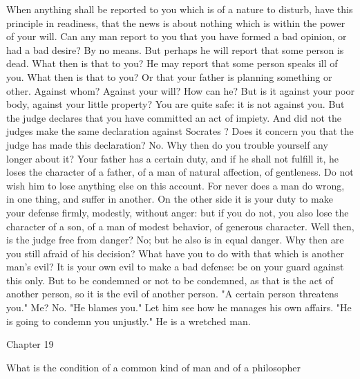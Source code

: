 \documentclass[a4paper]{article}
\begin{document}
    When anything shall be reported to you which is of a nature to disturb,
have this principle in readiness, that the news is about nothing which is
within the power of your will. Can any man report to you that you have formed a
bad opinion, or had a bad desire? By no means. But perhaps he will report that
some person is dead. What then is that to you? He may report that some person
speaks ill of you. What then is that to you? Or that your father is planning
something or other. Against whom? Against your will? How can he? But is it
against your poor body, against your little property? You are quite safe: it is
not against you. But the judge declares that you have committed an act of
impiety. And did not the judges make the same declaration against Socrates ?
Does it concern you that the judge has made this declaration? No. Why then do
you trouble yourself any longer about it? Your father has a certain duty, and
if he shall not fulfill it, he loses the character of a father, of a man of
natural affection, of gentleness. Do not wish him to lose anything else on this
account. For never does a man do wrong, in one thing, and suffer in another. On
the other side it is your duty to make your defense firmly, modestly, without
anger: but if you do not, you also lose the character of a son, of a man of
modest behavior, of generous character. Well then, is the judge free from
danger? No; but he also is in equal danger. Why then are you still afraid of
his decision? What have you to do with that which is another man's evil? It is
your own evil to make a bad defense: be on your guard against this only. But to
be condemned or not to be condemned, as that is the act of another person, so
it is the evil of another person. "A certain person threatens you." Me? No. "He
blames you." Let him see how he manages his own affairs. "He is going to
condemn you unjustly." He is a wretched man.

Chapter 19

What is the condition of a common kind of man and of a philosopher
\end{document}
